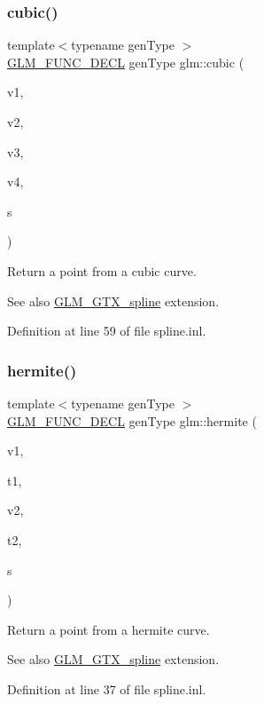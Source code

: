\subsubsection{\texorpdfstring{cubic()}{cubic()}}
{\footnotesize\ttfamily template$<$typename gen\+Type $>$ \\
\hyperlink{setup_8hpp_ab2d052de21a70539923e9bcbf6e83a51}{G\+L\+M\+\_\+\+F\+U\+N\+C\+\_\+\+D\+E\+CL} gen\+Type glm\+::cubic (\begin{DoxyParamCaption}\item[{gen\+Type const \&}]{v1,  }\item[{gen\+Type const \&}]{v2,  }\item[{gen\+Type const \&}]{v3,  }\item[{gen\+Type const \&}]{v4,  }\item[{typename gen\+Type\+::value\+\_\+type const \&}]{s }\end{DoxyParamCaption})}

Return a point from a cubic curve. \begin{DoxySeeAlso}{See also}
\hyperlink{group__gtx__spline}{G\+L\+M\+\_\+\+G\+T\+X\+\_\+spline} extension. 
\end{DoxySeeAlso}


Definition at line 59 of file spline.\+inl.

\mbox{\label{group__gtx__spline_gaa69e143f6374d32f934a8edeaa50bac9}} 
\subsubsection{\texorpdfstring{hermite()}{hermite()}}
{\footnotesize\ttfamily template$<$typename gen\+Type $>$ \\
\hyperlink{setup_8hpp_ab2d052de21a70539923e9bcbf6e83a51}{G\+L\+M\+\_\+\+F\+U\+N\+C\+\_\+\+D\+E\+CL} gen\+Type glm\+::hermite (\begin{DoxyParamCaption}\item[{gen\+Type const \&}]{v1,  }\item[{gen\+Type const \&}]{t1,  }\item[{gen\+Type const \&}]{v2,  }\item[{gen\+Type const \&}]{t2,  }\item[{typename gen\+Type\+::value\+\_\+type const \&}]{s }\end{DoxyParamCaption})}

Return a point from a hermite curve. \begin{DoxySeeAlso}{See also}
\hyperlink{group__gtx__spline}{G\+L\+M\+\_\+\+G\+T\+X\+\_\+spline} extension. 
\end{DoxySeeAlso}


Definition at line 37 of file spline.\+inl.

